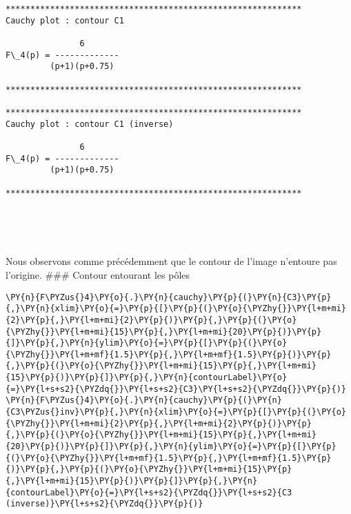     \begin{Verbatim}[commandchars=\\\{\}]
************************************************************
Cauchy plot : contour C1

               6
F\_4(p) = -------------
         (p+1)(p+0.75)

************************************************************

************************************************************
Cauchy plot : contour C1 (inverse)

               6
F\_4(p) = -------------
         (p+1)(p+0.75)

************************************************************

    \end{Verbatim}

    \begin{center}
    \end{center}
    { \hspace*{\fill} \\}
    
    \begin{center}
    \end{center}
    { \hspace*{\fill} \\}
    
    Nous observons comme précédemment que le contour de l'image n'entoure
pas l'origine. \#\#\# Contour entourant les pôles

    \begin{tcolorbox}[breakable, size=fbox, boxrule=1pt, pad at break*=1mm,colback=cellbackground, colframe=cellborder]
\begin{Verbatim}[commandchars=\\\{\}]
\PY{n}{F\PYZus{}4}\PY{o}{.}\PY{n}{cauchy}\PY{p}{(}\PY{n}{C3}\PY{p}{,}\PY{n}{xlim}\PY{o}{=}\PY{p}{[}\PY{p}{(}\PY{o}{\PYZhy{}}\PY{l+m+mi}{2}\PY{p}{,}\PY{l+m+mi}{2}\PY{p}{)}\PY{p}{,}\PY{p}{(}\PY{o}{\PYZhy{}}\PY{l+m+mi}{15}\PY{p}{,}\PY{l+m+mi}{20}\PY{p}{)}\PY{p}{]}\PY{p}{,}\PY{n}{ylim}\PY{o}{=}\PY{p}{[}\PY{p}{(}\PY{o}{\PYZhy{}}\PY{l+m+mf}{1.5}\PY{p}{,}\PY{l+m+mf}{1.5}\PY{p}{)}\PY{p}{,}\PY{p}{(}\PY{o}{\PYZhy{}}\PY{l+m+mi}{15}\PY{p}{,}\PY{l+m+mi}{15}\PY{p}{)}\PY{p}{]}\PY{p}{,}\PY{n}{contourLabel}\PY{o}{=}\PY{l+s+s2}{\PYZdq{}}\PY{l+s+s2}{C3}\PY{l+s+s2}{\PYZdq{}}\PY{p}{)}
\PY{n}{F\PYZus{}4}\PY{o}{.}\PY{n}{cauchy}\PY{p}{(}\PY{n}{C3\PYZus{}inv}\PY{p}{,}\PY{n}{xlim}\PY{o}{=}\PY{p}{[}\PY{p}{(}\PY{o}{\PYZhy{}}\PY{l+m+mi}{2}\PY{p}{,}\PY{l+m+mi}{2}\PY{p}{)}\PY{p}{,}\PY{p}{(}\PY{o}{\PYZhy{}}\PY{l+m+mi}{15}\PY{p}{,}\PY{l+m+mi}{20}\PY{p}{)}\PY{p}{]}\PY{p}{,}\PY{n}{ylim}\PY{o}{=}\PY{p}{[}\PY{p}{(}\PY{o}{\PYZhy{}}\PY{l+m+mf}{1.5}\PY{p}{,}\PY{l+m+mf}{1.5}\PY{p}{)}\PY{p}{,}\PY{p}{(}\PY{o}{\PYZhy{}}\PY{l+m+mi}{15}\PY{p}{,}\PY{l+m+mi}{15}\PY{p}{)}\PY{p}{]}\PY{p}{,}\PY{n}{contourLabel}\PY{o}{=}\PY{l+s+s2}{\PYZdq{}}\PY{l+s+s2}{C3 (inverse)}\PY{l+s+s2}{\PYZdq{}}\PY{p}{)}
\end{Verbatim}
\end{tcolorbox}

